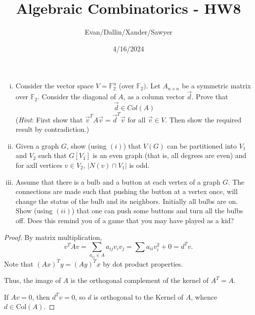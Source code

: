 \documentclass[11pt,letterpaper]{article}
\title{Algebraic Combinatorics - HW8}
\author{Evan/Dallin/Xander/Sawyer}
\date{4/16/2024}
\begin{document}
\maketitle
\begin{quest}[\textcolor{red}{Saving electricity through Linear Algebra and Graph Theory}]
    \begin{enumerate}[(i)]
        \item Consider the vector space $V=\mathbb{F}_2^n$ (over $\mathbb{F}_2)$. Let $A_{n\times n}$ be a symmetric matrix over $\mathbb{F}_2$. Consider the diagonal of $A$, as a column vector $\overrightarrow{d}$. Prove that 
        \[\vec{d}\in Col(A)\]
        (\textit{Hint}: First show that $\vec{v}^{T}A\vec{v}=\vec{d}^{T}\vec{v}$ for all $\vec{v}\in V$. Then show the required result by contradiction.)
        \item Given a graph $G$, show (using $(i)$) that $V(G)$ can be partitioned into $V_1$ and $V_2$ such that $G[V_1]$ is an even graph (that is, all degrees are even) and for axll vertices $v\in V_2$, $|N(v)\cap V_1|$ is odd.
        \item Assume that there is a bulb and a button at each vertex of a graph $G$. The connections are made such that pushing the button at a vertex once, will change the status of the bulb and its neighbors. Initially all bulbs are on. Show (using $(ii)$) that one can push some buttons and turn all the bulbs off. Does this remind you of a game that you may have played as a kid?
    \end{enumerate}
\end{quest}
\begin{proof}
    By matrix multiplication, \[v^TAv=\sum_{a_{ij}\in A}a_{ij}v_iv_j=\sum a_{ii}v_i^2+0=d^Tv.\]
    Note that $(Ax)^Ty=(Ay)^Tx$ by dot product properties. 
    
    Thus, the image of $A$ is the orthogonal complement of the kernel of $A^T=A$.

    If $Av=0$, then $d^Tv=0$, so $d$ is orthogonal to the Kernel of $A$, whence $d\in \text{Col}(A)$.


\end{proof}
\end{document}
